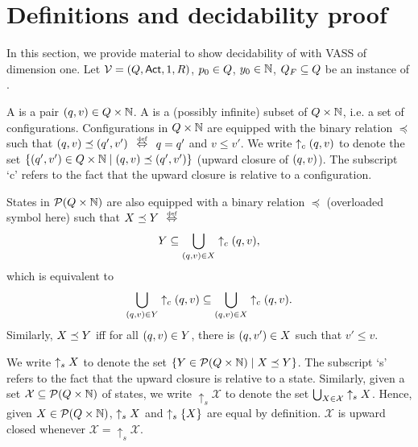 \documentclass[envcountsame,a4paper,12pt]{llncs}
\begin{document}
\section{Definitions and decidability proof}

In this section, we provide material to show decidability of \ourvasspb with VASS of dimension one.
Let $\mathcal{V} = (Q,{\rm \sf Act},1,R)$,
$p_0 \in Q$, $y_0 \in \mathbb{N}$, $Q_F \subseteq Q$ be an
instance of \ourvasspb.


A  is a pair $(q,v) \in Q \times \mathbb{N}$.
A  is a (possibly infinite) subset of $Q \times \mathbb{N}$, i.e. a set of configurations.
Configurations in $Q \times \mathbb{N}$ are equipped with the binary relation
$\preceq$ such that $(q,v) \preceq (q',v')$ $\equivdef$
$q = q'$ and $v \leq v'$.
We write $\uparrow_c (q,v)$ to denote the set
$\{ (q',v') \in Q \times \mathbb{N}
  \mid (q,v) \preceq (q',v') \}$
(upward closure of $(q,v)$).
The subscript `c' refers to the fact that the upward closure is relative to a configuration.

  States in ${\cal P}(Q \times \mathbb{N})$ are also equipped with a binary relation
  $\preceq$ (overloaded symbol here) such that
  $X \preceq Y$ $\equivdef$
  $$
  Y
  \subseteq \bigcup_{(q,v) \in X} \uparrow_c (q,v),
  $$
  which is equivalent to
  $$
  \bigcup_{(q,v) \in Y}  \uparrow_c (q,v)
  \subseteq \bigcup_{(q,v) \in X} \uparrow_c (q,v).
  $$
  Similarly, $X \preceq Y$ iff for all
  $(q,v) \in Y$, there is
  $(q,v') \in X$ such that $v' \leq v$. 

  We write $\uparrow_s X$ to denote the set
  $\{ Y \in {\cal P}(Q \times \mathbb{N}) \mid X \preceq Y \}$.
  The subscript `s' refers to the fact that the upward closure is relative to a state.
  Similarly, given a set $\mathcal{X} \subseteq {\cal P}(Q \times \mathbb{N})$ of states,
  we write $\uparrow_s \mathcal{X}$ to denote the set $\bigcup_{X \in \mathcal{X}} \uparrow_s X$.
  Hence, given $X \in {\cal P}(Q \times \mathbb{N})$,
  $\uparrow_s X$ and $\uparrow_s \{ X \}$ are equal by definition.  
  $\mathcal{X}$ is upward closed whenever $\mathcal{X} = \uparrow_s \mathcal{X}$. 
\end{document}
